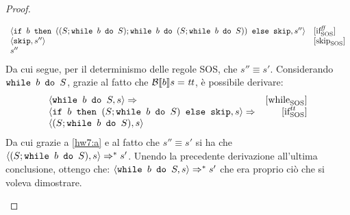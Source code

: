 {\begin{proof}
\begin{itemize}
$$\begin{array}{ll}
		\confSs{\ifABC{b}{((S; \wbS{b}{S}); \wbS{b}{(S; \wbS{b}{S})})}{\skipForFriends}}{s''} & \ifffSOS \\
		\confSs{\skipForFriends}{s''} & \skipSOS\\
		s''
	\end{array}
	$$
	Da cui segue, per il determinismo delle regole SOS, che $s'' \equiv s'$.
	Considerando $\wbS{b}{S}$, grazie al fatto che
	$\B{b} = \semtrue$, è possibile derivare:
	$$
	\begin{array}{lr}
	\confSs{\wbS{b}{S}}{s} \Rar{ } & \whileSOS \\
	\confSs{\ifABC{b}{(S; \wbS{b}{S})}{\skipForFriends}}{s}  \Rar{ } & \ifttSOS \\
	\confSs{(S; \wbS{b}{S})}{s} & \\
	\end{array}
	$$
	Da cui grazie a \ref{hw7:a} e al fatto che $s'' \equiv s'$ si ha che
	$\confSs{(S; \wbS{b}{S})}{s} \Rar{*} s'$. Unendo la precedente derivazione
	all'ultima conclusione, ottengo che:
	$\confSs{\wbS{b}{S}}{s} \Rar{*} s'$ che era proprio ciò che si voleva
	dimostrare.

\end{itemize}

\end{proof}


}
